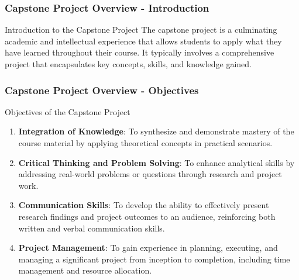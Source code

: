 \documentclass[aspectratio=169]{beamer}
\begin{document}
\frame{\titlepage}

\begin{frame}[fragile]
    \frametitle{Capstone Project Overview - Introduction}
    \begin{block}{Introduction to the Capstone Project}
        The capstone project is a culminating academic and intellectual experience that allows students to apply what they have learned throughout their course. It typically involves a comprehensive project that encapsulates key concepts, skills, and knowledge gained.
    \end{block}
\end{frame}

\begin{frame}[fragile]
    \frametitle{Capstone Project Overview - Objectives}
    \begin{block}{Objectives of the Capstone Project}
        \begin{enumerate}
            \item \textbf{Integration of Knowledge}: To synthesize and demonstrate mastery of the course material by applying theoretical concepts in practical scenarios.
            \item \textbf{Critical Thinking and Problem Solving}: To enhance analytical skills by addressing real-world problems or questions through research and project work.
            \item \textbf{Communication Skills}: To develop the ability to effectively present research findings and project outcomes to an audience, reinforcing both written and verbal communication skills.
            \item \textbf{Project Management}: To gain experience in planning, executing, and managing a significant project from inception to completion, including time management and resource allocation.
        \end{enumerate}
    \end{block}
\end{frame}
\end{document}
